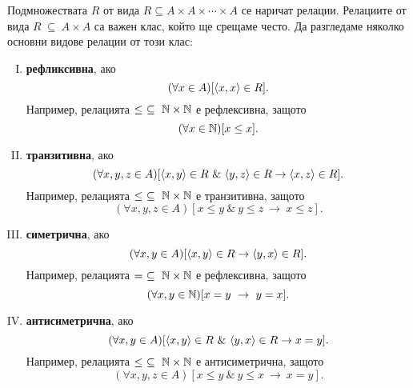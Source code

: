 Подмножествата $R$ от вида $R \subseteq A\times A\times\cdots\times A$ се наричат релации.
Релациите от вида $R\ \subseteq\ A\times A$ са важен клас, който ще срещаме често.
Да разгледаме няколко основни видове релации от този клас:
\begin{enumerate}[I)]
\item
  {\bf рефликсивна}, ако
  \[(\forall x\in A)[\langle{x,x}\rangle\in R].\]
  Например, релацията $\leq\ \subseteq\ \Nat\times\Nat$ е рефлексивна, защото
  \[(\forall x\in \mathbb{N})[x \leq x].\]
\item
  {\bf транзитивна}, ако
  \[(\forall x,y,z\in A)[\pair{x,y}\in R\ \&\ \pair{y,z}\in R \rightarrow \pair{x,z}\in R].\]
  Например, релацията $\leq\ \subseteq\ \Nat\times\Nat$ е транзитивна, защото
  \[(\forall x,y,z\in A)[x \leq y\ \&\ y \leq z\ \rightarrow\ x\leq z].\]
\item
  {\bf симетрична}, ако
  \[(\forall x,y\in A)[\langle{x,y}\rangle\in R \rightarrow \langle{y,x}\rangle\in R].\]
  Например, релацията $=\ \subseteq\ \mathbb{N}\times\mathbb{N}$ е рефлексивна, защото
  \[(\forall x,y\in \Nat)[x = y\ \rightarrow\ y = x].\]
\item
  {\bf антисиметрична}, ако
  \[(\forall x,y\in A)[\pair{x,y}\in R\ \&\ \pair{y,x}\in R \rightarrow x = y].\]
  Например, релацията $\leq\ \subseteq\ \Nat\times\Nat$ е антисиметрична, защото
  \[(\forall x,y,z\in A)[x \leq y\ \&\ y \leq x\ \rightarrow\ x = y].\]
\end{enumerate}



